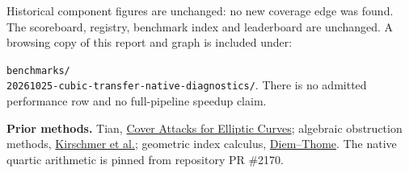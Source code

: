 \documentclass[10pt]{article}
\begin{document}
Historical component figures are unchanged: no new coverage edge was
found. The scoreboard, registry, benchmark index and leaderboard are
unchanged. A browsing copy of this report and graph is included under:
\par\texttt{benchmarks/}\\
\texttt{20261025-cubic-transfer-native-diagnostics/}.
There is no admitted performance row and no full-pipeline speedup claim.

\textbf{Prior methods.} Tian, \href{https://arxiv.org/abs/2012.07173}{Cover
Attacks for Elliptic Curves}; algebraic obstruction methods,
\href{https://arxiv.org/abs/2004.08315}{Kirschmer et al.}; geometric
index calculus, \href{https://members.loria.fr/EThome/files/non-he-genus3.pdf}{Diem--Thome}.
The native quartic arithmetic is pinned from repository PR \#2170.
\end{document}
